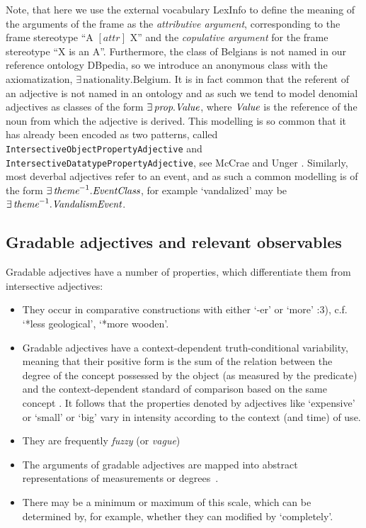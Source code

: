 \documentclass[11pt]{article}
\begin{document}
Note, that here we use the external vocabulary LexInfo \cite{cimiano2011lexinfo} 
to define the meaning of the arguments of the frame as the \emph{attributive 
argument}, corresponding to the frame stereotype ``A $[attr]$ X'' and the 
\emph{copulative argument} for the frame stereotype ``X is an A''. Furthermore,
the class of Belgians is not named in our reference ontology DBpedia, so we 
introduce an anonymous class with the axiomatization, 
$\exists\,\text{nationality}.\text{Belgium}$. It is in fact common that the 
referent of an adjective is not named in an ontology and as such we tend to 
model denomial adjectives as classes of the form $\exists\,\text{\em prop}.\text{\em Value}$, 
where $\text{\em Value}$ is the reference of the noun from which the adjective is
derived. This modelling is so common that it has already been encoded as two
patterns, called {\tt IntersectiveObjectPropertyAdjective} and {\tt
IntersectiveDatatypePropertyAdjective}, see McCrae and Unger .
Similarly, most deverbal adjectives refer to an event, and as such
a common modelling is of the form $\exists\,\text{\em theme}^{-1}.\text{\em EventClass}$, 
for example `vandalized' may be $\exists\,\text{\em theme}^{-1}.\text{\em VandalismEvent}$.

\subsection{Gradable adjectives and relevant observables} \label{sec:gradables}

Gradable adjectives have a number of properties, which differentiate them
from intersective adjectives:

\begin{itemize}
\item They occur in comparative constructions with either `-er' or `more' \cite{kennedy1999scalar}:3), c.f. `*less geological', `*more wooden'.
\item Gradable adjectives have a context-dependent truth-conditional variability, meaning that their positive form is the sum of the relation between the degree of the concept possessed by the object (as measured by the predicate) and the context-dependent standard of comparison based on the same concept \cite{kennedy2007vagueness}. It follows that the properties denoted by adjectives like `expensive' or `small' or `big' vary in intensity according to the context (and time) of use. 
\item They are frequently \emph{fuzzy} (or \emph{vague})~\cite{kennedy2007vagueness}
\item The arguments of gradable adjectives are mapped into abstract representations of measurements or degrees~\cite{kennedy2007vagueness}.
\item There may be a minimum or maximum of this scale, which can be determined
by, for example, whether they can modified by `completely'.
\end{itemize}
\end{document}
